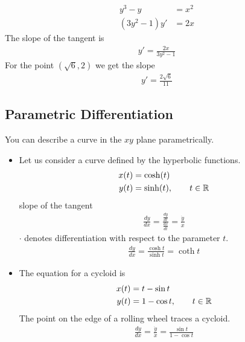 \begin{ex}
\begin{align*}
y^3-y &= x^2 \\
(3y^2 -1) y' & = 2x
\end{align*}
The slope of the tangent is 
\begin{align*}
y' = \frac{2x}{3y^2-1}
\end{align*}
For the point $(\sqrt 6, 2)$ we get the slope 
\begin{align*}
y' = \frac{2 \sqrt6}{11}
\end{align*}
\end{ex}
\subsection{Parametric Differentiation}
You can describe a curve in the $xy$ plane parametrically.
\begin{ex}
\begin{itemize}
\item 
Let us consider a curve defined by the hyperbolic functions.
\begin{align*}
x(t) & = \cosh(t) \\
y(t) & = \sinh (t), \qquad t \in \mathbb R
\end{align*}
slope of the tangent
\begin{align*}
\frac{dy}{dx} = \frac{\frac{dy}{dt}}{\frac{dx}{dt}} = \frac{\dot{y}}{\dot x}
\end{align*}
$\cdot $ denotes differentiation with respect to the parameter $t$.
\begin{align*}
\frac{dy}{dx} = \frac{\cosh t}{\sinh t} = \coth t
\end{align*}
\item 
The equation for a cycloid is
\begin{align*}
x(t) & = t - \sin t \\
y(t) & = 1- \cos t, \qquad t \in \mathbb R
\end{align*}
The point on the edge of a rolling wheel traces a cycloid.
\begin{align*}
\frac{dy}{dx} = \frac{\dot y}{\dot x} = \frac{\sin t }{1- \cos t}
\end{align*}
\end{itemize}
\end{ex}

